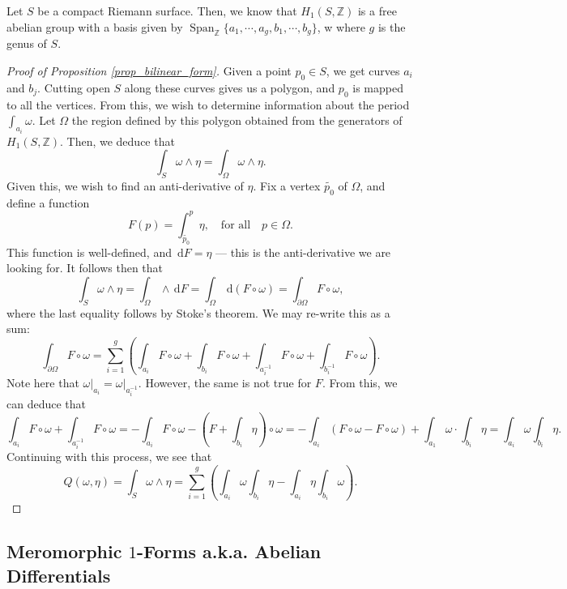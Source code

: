 \documentclass[a4paper]{report}
\theoremstyle{definition}
\theoremstyle{remark}
\theoremstyle{proposition}
\theoremstyle{conjecture}
\theoremstyle{lemma}
\theoremstyle{corollary}
\theoremstyle{exercise}
\theoremstyle{example}
\newcommand{\diff}{\,\mathrm{d}}
\newcommand{\on}{\operatorname}
\begin{document}
Let $S$ be a compact Riemann surface. Then, we know that $H_1(S,\mathbb{Z})$ 
is a free abelian group with a basis given by 
$\on{Span}_{\mathbb{Z}}\lbrace a_1,\cdots,a_g,b_1,\cdots,b_g\rbrace$, w
where $g$ is the genus of $S$. 
\begin{proof}[Proof of Proposition \ref{prop_bilinear_form}]
    Given a point $p_0\in S$, we get curves $a_i$
    and $b_j$. Cutting open $S$ along these curves gives us a polygon,
    and $p_0$ is mapped to all the vertices. From this, we wish to determine
    information about the period $\int_{a_i}\omega$. Let $\Omega$ the region
    defined by this polygon
    obtained from the generators of $H_1(S,\mathbb{Z})$. Then,
    we deduce that 
    $$\int_S \omega \wedge \eta = \int_\Omega \omega \wedge \eta.$$
    Given this, we wish to find an anti-derivative of $\eta$. Fix a vertex 
    $\widetilde{p_0}$ of $\Omega$, and define a function 
    $$F(p) = \int_{\widetilde{p_0}}^p \eta, \quad \text{for all}\quad p \in \Omega.$$
    This function is well-defined, and $\diff F = \eta$ --- this is the 
    anti-derivative we are looking for. It follows then that 
    $$\int_S \omega \wedge\eta = \int_\Omega \wedge \diff F = \int_\Omega \diff(F\circ \omega) = \int_{\partial \Omega}F \circ \omega,$$
    where the last equality follows by Stoke's theorem. We may re-write this as
    a sum:
    $$\int_{\partial\Omega}F\circ \omega = \sum_{i=1}^g \left(\int_{a_i}F\circ \omega + \int_{b_i}F\circ \omega + \int_{a_i^{-1}}F\circ \omega + \int_{b_i^{-1}}F\circ \omega\right).$$
    Note here that $\omega\vert_{a_i} = \omega\vert_{a_i^{-1}}$. However,
    the same is not true for $F$.
    From this, we can deduce that 
    $$\int_{a_i} F\circ \omega + \int_{a_i^{-1}} F\circ \omega = -\int_{a_i} F\circ \omega - \left(F + \int_{b_i} \eta\right)\circ \omega = -\int_{a_i} (F\circ \omega - F\circ \omega) + \int_{a_1}\omega \cdot \int_{b_i}\eta = \int_{a_i}\omega\int_{b_i}\eta.$$
    Continuing with this process, we see that 
    $$Q(\omega,\eta) = \int_S \omega\wedge \eta = \sum_{i=1}^g \left(\int_{a_i}\omega\int_{b_i}\eta - \int_{a_i}\eta \int_{b_i}\omega\right).$$
\end{proof}

\subsection{Meromorphic $1$-Forms a.k.a. Abelian Differentials}
\end{document}
